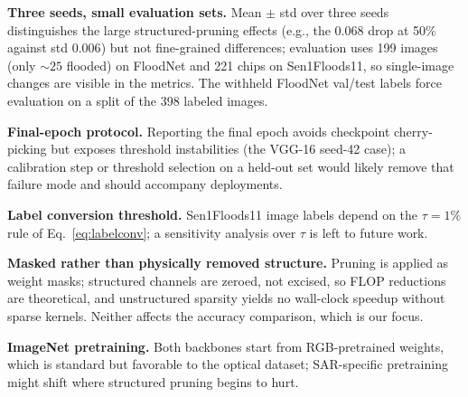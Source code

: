 \documentclass[conference]{IEEEtran}
\newif\ifreview
\newcommand{\REV}[1]{\ifreview\textcolor{red}{\textbf{[Revise: #1]}}\fi}
\begin{document}
\textbf{Three seeds, small evaluation sets.} Mean $\pm$ std over three
seeds distinguishes the large structured-pruning effects (e.g., the
$0.068$ drop at 50\% against std $0.006$) but not fine-grained
differences; evaluation uses 199 images (only ${\sim}25$ flooded) on
FloodNet and
221 chips on Sen1Floods11, so single-image changes are visible in the
metrics. The withheld FloodNet val/test labels force evaluation on a
split of the 398 labeled images.

\textbf{Final-epoch protocol.} Reporting the final epoch avoids
checkpoint cherry-picking but exposes threshold instabilities (the
VGG-16 seed-42 case); a calibration step or threshold selection on a
held-out set would likely remove that failure mode and should
accompany deployments.

\textbf{Label conversion threshold.} Sen1Floods11 image labels depend
on the $\tau=1\%$ rule of Eq.~\eqref{eq:labelconv}; a sensitivity
analysis over $\tau$ is left to future work.

\textbf{Masked rather than physically removed structure.} Pruning is
applied as weight masks; structured channels are zeroed, not excised,
so FLOP reductions are theoretical, and unstructured sparsity yields
no wall-clock speedup without sparse kernels. Neither affects the
accuracy comparison, which is our focus.

\textbf{ImageNet pretraining.} Both backbones start from RGB-pretrained
weights, which is standard but favorable to the optical dataset;
SAR-specific pretraining might shift where structured pruning begins
to hurt.
\REV{[A10] This section is good and honest -- keep it, but shorten
to fit. After doing B1--B6 delete the corresponding limitation
sentences (``label conversion threshold'', ``masked rather than
physically removed'') or turn them into one-line remaining caveats.
Add two caveats still missing: (a) random chip-level split / spatial
correlation (if B2 is not done); (b) only two architectures, both
pre-2016 CNNs -- state that conclusions may not hold for
MobileNet/EfficientNet/ViT (C: a MobileNet run would also tie in
nicely with edge deployment and our own prior lightweight-CNN work).
Also: the ``Mean $\pm$ std'' sentence should use the sample std (A9).}

\end{document}
